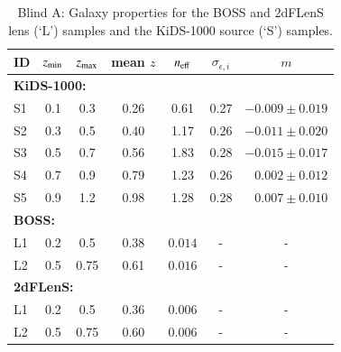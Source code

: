 \begin{appendix}
\begin{table}
\caption{Blind A: Galaxy properties for the BOSS and 2dFLenS lens (\lq L\rq) samples and the KiDS-1000 source (\lq S\rq) samples.}              %
\label{tab:datatab}      %
\centering                                      %
\begin{tabular}{lcccccr}          %
\hline\hline                        %
ID & $z_{\rm min}$ &  $z_{\rm max}$& mean $z$ & $n_{\rm eff}$ & $\sigma_{\epsilon,i}$ & \multicolumn{1}{c}{$m$}\\    %
\hline
\multicolumn{6}{l}{\bf KiDS-1000:}\\  
S1 & 0.1 & 0.3 & 0.26 & 0.61 &  0.27 & $-0.009\pm0.019$\\
S2 & 0.3 & 0.5 & 0.40 & 1.17 &  0.26 & $-0.011\pm0.020$\\
S3 & 0.5 & 0.7 & 0.56 & 1.83 &  0.28 & $-0.015\pm0.017$\\
S4 & 0.7 & 0.9 & 0.79 & 1.23 &  0.26 & $0.002\pm0.012$\\
S5 & 0.9 & 1.2 & 0.98 & 1.28 &  0.28 & $0.007\pm0.010$\\
\hline      
\multicolumn{6}{l}{\bf BOSS:}\\                             %
L1 & 0.2 & 0.5 & 0.38 & $0.014$ & -  & \multicolumn{1}{c}{-}\\
L2 & 0.5 & 0.75 & 0.61 & $0.016$ & -  & \multicolumn{1}{c}{-}\\
\hline      
\multicolumn{6}{l}{\bf 2dFLenS:}\\                                %
L1 & 0.2 & 0.5 & 0.36 & $0.006$ & - & \multicolumn{1}{c}{-}\\
L2 & 0.5 & 0.75 & 0.60 & $0.006$ & - & \multicolumn{1}{c}{-}\\
\hline
\end{tabular}
\end{table}


\end{appendix}
